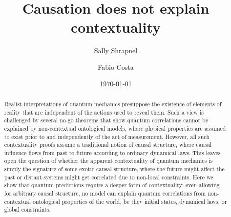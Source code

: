 \documentclass[a4paper,onecolumn,11pt,accepted=2018-05-04]{quantumarticle}
\begin{document}
 
\title{Causation does not explain contextuality}

\author{Sally Shrapnel}
\author{Fabio Costa}
\date{\today}
\begin{abstract}

Realist interpretations of quantum mechanics presuppose the existence of elements of reality that are independent of the actions used to reveal them. Such a view is challenged by several no-go theorems that show quantum correlations cannot be explained by non-contextual ontological models, where physical properties are assumed to exist prior to and independently of the act of measurement. However, all such contextuality proofs assume a traditional notion of causal structure, where causal influence flows from past to future according to ordinary dynamical laws. This leaves open the question of whether the apparent contextuality of quantum mechanics is simply the signature of some exotic causal structure, where the future might affect the past or distant systems might get correlated due to non-local constraints. Here we show that quantum predictions require a deeper form of contextuality: even allowing for arbitrary causal structure, no model can explain quantum correlations from non-contextual ontological properties of the world, be they initial states, dynamical laws, or global constraints.

 

\end{abstract}
\maketitle
\end{document}
